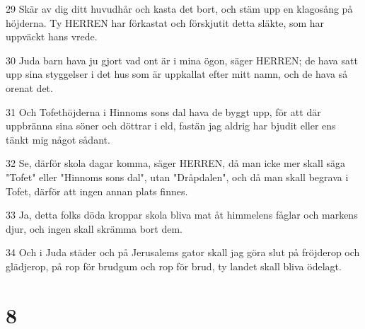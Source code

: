 \par 29 Skär av dig ditt huvudhår och kasta det bort, och stäm upp en klagosång på höjderna. Ty HERREN har förkastat och förskjutit detta släkte, som har uppväckt hans vrede.
\par 30 Juda barn hava ju gjort vad ont är i mina ögon, säger HERREN; de hava satt upp sina styggelser i det hus som är uppkallat efter mitt namn, och de hava så orenat det.
\par 31 Och Tofethöjderna i Hinnoms sons dal hava de byggt upp, för att där uppbränna sina söner och döttrar i eld, fastän jag aldrig har bjudit eller ens tänkt mig något sådant.
\par 32 Se, därför skola dagar komma, säger HERREN, då man icke mer skall säga "Tofet" eller "Hinnoms sons dal", utan "Dråpdalen", och då man skall begrava i Tofet, därför att ingen annan plats finnes.
\par 33 Ja, detta folks döda kroppar skola bliva mat åt himmelens fåglar och markens djur, och ingen skall skrämma bort dem.
\par 34 Och i Juda städer och på Jerusalems gator skall jag göra slut på fröjderop och glädjerop, på rop för brudgum och rop för brud, ty landet skall bliva ödelagt.

\chapter{8}

